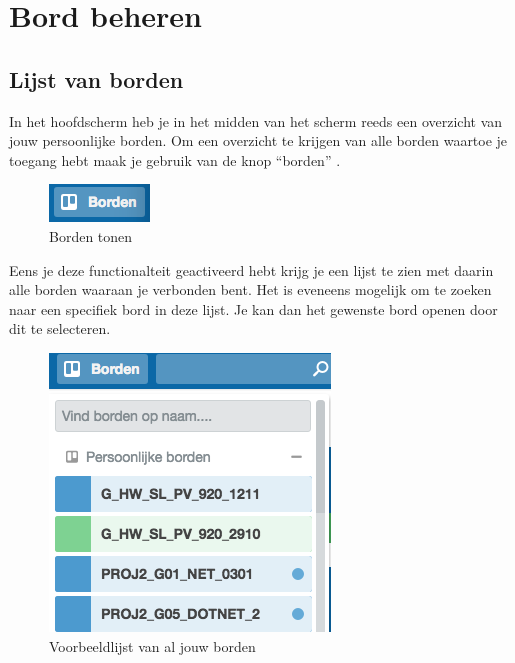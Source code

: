 \chapter{Bord beheren}

\section{Lijst van borden}

In het hoofdscherm  heb je in het midden van het scherm reeds een overzicht van jouw persoonlijke borden. Om een overzicht te krijgen van alle borden waartoe je toegang hebt maak je gebruik van de knop ``borden''  .
\\

\begin{figure}[h]
	\centering
	\includegraphics[scale=.7]{./afbeeldingen/borden.png}
	\caption{Borden tonen}
	\label{fig:borden}	
\end{figure} 

\noindent
Eens je deze functionalteit geactiveerd hebt krijg je een lijst   te zien met daarin alle borden waaraan je verbonden bent. Het is eveneens mogelijk om te zoeken naar een specifiek bord in deze lijst. Je kan dan het gewenste bord openen door dit te selecteren.\\

\begin{figure}[H]
	\centering
	\includegraphics[scale=.5]{./afbeeldingen/lijst_borden.png}
	\caption{Voorbeeldlijst van al jouw borden}
	\label{fig:lijst_borden}	
\end{figure} 

